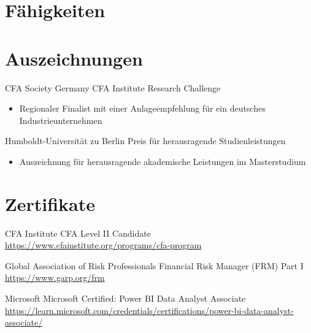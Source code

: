 \documentclass[a4paper, serif, 10pt]{moderncv}
\begin{document}
\section{Fähigkeiten}

\section{Auszeichnungen}

        {CFA Society Germany}
        {CFA Institute Research Challenge}
        {}
        {}
        {\begin{itemize}
\item Regionaler Finalist mit einer Anlageempfehlung für ein deutsches Industrieunternehmen
\end{itemize}}

        {Humboldt-Universität zu Berlin}
        {Preis für herausragende Studienleistungen}
        {}
        {}
        {\begin{itemize}
\item Auszeichnung für herausragende akademische Leistungen im Masterstudium
\end{itemize}}
\section{Zertifikate}

        {CFA Institute}
        {CFA Level II Candidate}
        {\url{https://www.cfainstitute.org/programs/cfa-program}}
        {}
        {}

        {Global Association of Risk Professionals}
        {Financial Risk Manager (FRM) Part I}
        {\url{https://www.garp.org/frm}}
        {}
        {}

        {Microsoft}
        {Microsoft Certified: Power BI Data Analyst Associate}
        {\url{https://learn.microsoft.com/credentials/certifications/power-bi-data-analyst-associate/}}
        {}
        {}
\end{document}
